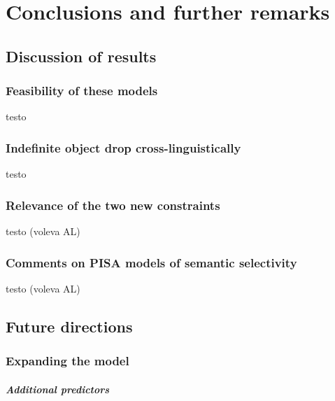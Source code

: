 \setchapterpreamble[u]{\margintoc}
\chapter{Conclusions and further remarks}


\section{Discussion of results} 

\subsection{Feasibility of these models}

testo

\subsection{Indefinite object drop cross-linguistically}

testo

\subsection{Relevance of the two new constraints}

testo (voleva AL)

\subsection{Comments on PISA models of semantic selectivity}

testo (voleva AL)


\section{Future directions} 


\subsection{Expanding the model} 

\paragraph{Additional predictors}

